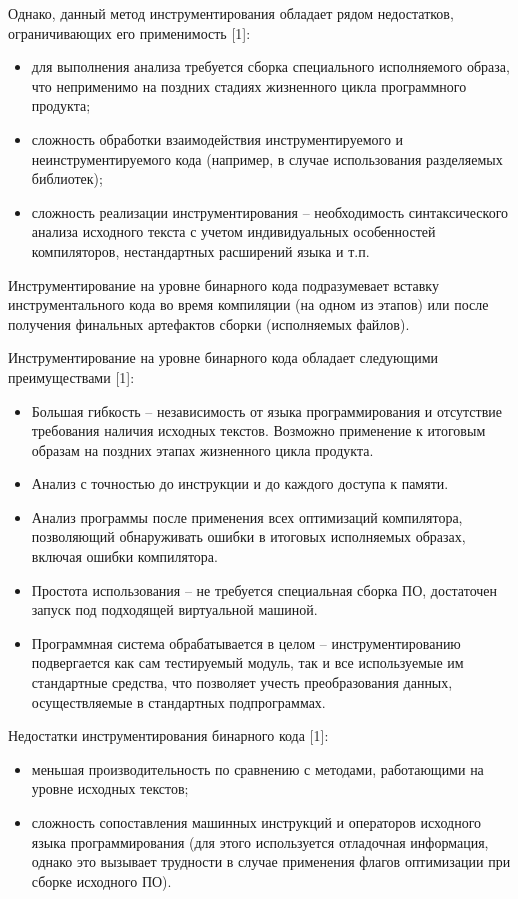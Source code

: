 Однако, данный метод инструментирования обладает рядом недостатков, ограничивающих его применимость [1]:
\begin{itemize}
  \item для выполнения анализа требуется сборка специального исполняемого образа, что неприменимо на поздних стадиях жизненного цикла программного продукта;
  \item сложность обработки взаимодействия инструментируемого и неинструментируемого кода (например, в случае использования разделяемых библиотек);
  \item сложность реализации инструментирования -- необходимость синтаксического анализа исходного текста с учетом индивидуальных особенностей компиляторов, нестандартных расширений языка и т.п.
\end{itemize}

Инструментирование на уровне бинарного кода подразумевает вставку инструментального кода во время компиляции (на одном из этапов) или после получения финальных артефактов сборки (исполняемых файлов).

Инструментирование на уровне бинарного кода обладает следующими преимуществами [1]:
\begin{itemize}
  \item Большая гибкость -- независимость от языка программирования и отсутствие требования наличия исходных текстов. Возможно применение к итоговым образам на поздних этапах жизненного цикла продукта.
  \item Анализ с точностью до инструкции и до каждого доступа к памяти.
  \item Анализ программы после применения всех оптимизаций компилятора, позволяющий обнаруживать ошибки в итоговых исполняемых образах, включая ошибки компилятора.
  \item Простота использования -- не требуется специальная сборка ПО, достаточен запуск под подходящей виртуальной машиной.
  \item Программная система обрабатывается в целом -- инструментированию подвергается как сам тестируемый модуль, так и все используемые им стандартные средства, что позволяет учесть преобразования данных, осуществляемые в стандартных подпрограммах.
\end{itemize}

Недостатки инструментирования бинарного кода [1]:
\begin{itemize}
  \item меньшая производительность по сравнению с методами, работающими на уровне исходных текстов;
  \item сложность сопоставления машинных инструкций и операторов исходного языка программирования (для этого используется отладочная информация, однако это вызывает трудности в случае применения флагов оптимизации при сборке исходного ПО).
\end{itemize}

